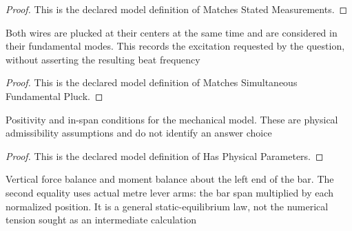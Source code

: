 \begin{proof}
  This is the declared model definition of Matches Stated Measurements.
\end{proof}
\begin{definition}
  \label{def:physics:phyx-mini-0172:phyxminiproblems-problemphyxmini0172-matchessimultaneousfundamentalpluck}
  Both wires are plucked at their centers at the same time and are considered in their fundamental modes. This records the excitation requested by the question, without asserting the resulting beat frequency
\end{definition}
\begin{proof}
  This is the declared model definition of Matches Simultaneous Fundamental Pluck.
\end{proof}
\begin{definition}
  \label{def:physics:phyx-mini-0172:phyxminiproblems-problemphyxmini0172-hasphysicalparameters}
  Positivity and in-span conditions for the mechanical model. These are physical admissibility assumptions and do not identify an answer choice
\end{definition}
\begin{proof}
  This is the declared model definition of Has Physical Parameters.
\end{proof}
\begin{definition}
  \label{def:physics:phyx-mini-0172:phyxminiproblems-problemphyxmini0172-satisfiesstaticequilibrium}
  Vertical force balance and moment balance about the left end of the bar. The second equality uses actual metre lever arms: the bar span multiplied by each normalized position. It is a general static-equilibrium law, not the numerical tension sought as an intermediate calculation
\end{definition}
